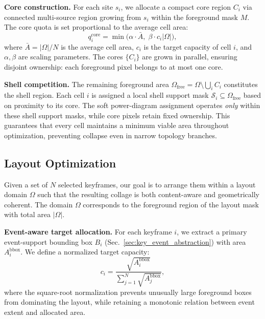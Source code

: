\textbf{Core construction.}
For each site $s_i$, we allocate a compact core region $C_i$ via connected multi-source region growing from $s_i$ within the foreground mask $M$. The core quota is set proportional to the average cell area:
\begin{equation}
q_i^{\text{core}} = \min\bigl(\alpha \cdot \bar{A},\; \beta \cdot c_i |\Omega|\bigr),
\end{equation}
where $\bar{A} = |\Omega|/N$ is the average cell area, $c_i$ is the target capacity of cell $i$, and $\alpha, \beta$ are scaling parameters. The cores $\{C_i\}$ are grown in parallel, ensuring disjoint ownership: each foreground pixel belongs to at most one core.

\textbf{Shell competition.}
The remaining foreground area $\Omega_{\text{free}} = \Omega \setminus \bigcup_i C_i$ constitutes the shell region. Each cell $i$ is assigned a local shell support mask $\mathcal{S}_i \subseteq \Omega_{\text{free}}$ based on proximity to its core. The soft power-diagram assignment operates \emph{only} within these shell support masks, while core pixels retain fixed ownership. This guarantees that every cell maintains a minimum viable area throughout optimization, preventing collapse even in narrow topology branches.

\subsection{Layout Optimization}
\label{subsec:layout_opt}

Given a set of $N$ selected keyframes, our goal is to arrange them within a layout domain $\Omega$ such that the resulting collage is both content-aware and geometrically coherent. The domain $\Omega$ corresponds to the foreground region of the layout mask with total area $|\Omega|$.

\vspace{1mm}
\noindent\textbf{Event-aware target allocation.}
For each keyframe $i$, we extract a primary event-support bounding box $B_i$ (Sec.~\ref{sec:key_event_abstraction}) with area $A_i^{\text{bbox}}$. We define a normalized target capacity:
\begin{equation}
c_i = \frac{\sqrt{A_i^{\text{bbox}}}}{\displaystyle\sum_{j=1}^{N} \sqrt{A_j^{\text{bbox}}}},
\end{equation}
where the square-root normalization prevents unusually large foreground boxes from dominating the layout, while retaining a monotonic relation between event extent and allocated area.

